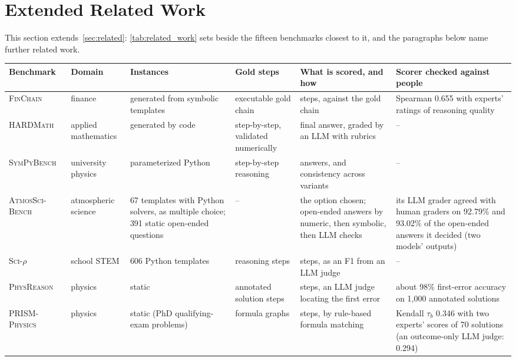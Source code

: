\section{Extended Related Work}
\label{appendix:related_work}

This section extends~\autoref{sec:related}: \autoref{tab:related_work} sets \ourdataset beside the
fifteen benchmarks closest to it, and the paragraphs below name further related work.

\begin{table}[t]
\centering
\footnotesize
\renewcommand{\arraystretch}{1.1}
\begin{tabular}{p{2.5cm}p{1.9cm}p{2.3cm}p{2.1cm}p{3.4cm}p{3.3cm}}
\toprule
\rowcolor{gray!10}
\textbf{Benchmark} & \textbf{Domain} & \textbf{Instances} & \textbf{Gold steps} & \textbf{What is scored, and how} & \textbf{Scorer checked against people} \\
\midrule
\textsc{FinChain}~\citep{xie2025finchain} & finance & generated from symbolic templates & executable gold chain & steps, against the gold chain & Spearman 0.655 with experts' ratings of reasoning quality \\
\textsc{HARDMath}~\citep{fan2024hardmath} & applied mathematics & generated by code & step-by-step, validated numerically & final answer, graded by an LLM with rubrics & -- \\
\textsc{SymPyBench}~\citep{imani2025sympybench} & university physics & parameterized Python & step-by-step reasoning & answers, and consistency across variants & -- \\
\textsc{AtmosSci-Bench}~\citep{li2025atmosscibench} & atmospheric science & 67 templates with Python solvers, as multiple choice; 391 static open-ended questions & -- & the option chosen; open-ended answers by numeric, then symbolic, then LLM checks & its LLM grader agreed with human graders on 92.79\% and 93.02\% of the open-ended answers it decided (two models' outputs) \\
\textsc{Sci}-$\rho$~\citep{azmi2026scirho} & school STEM & 606 Python templates & reasoning steps & steps, as an F1 from an LLM judge & -- \\
\textsc{PhysReason}~\citep{zhang2025physreason} & physics & static & annotated solution steps & steps, an LLM judge locating the first error & about 98\% first-error accuracy on 1,000 annotated solutions \\
\textsc{PRISM-Physics}~\citep{zhao2026prismphysics} & physics & static (PhD qualifying-exam problems) & formula graphs & steps, by rule-based formula matching & Kendall $\tau_b$ 0.346 with two experts' scores of 70 solutions (an outcome-only LLM judge: 0.294) \\

\end{tabular}
\end{table}
